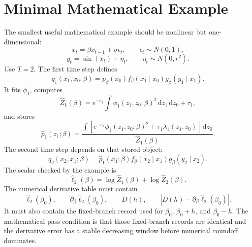 \documentclass[11pt]{article}
\numberwithin{equation}{section}
\newcommand{\dd}{\,\mathrm d}
\newcommand{\widehatell}{\widehat\ell}
\begin{document}
\section{Minimal Mathematical Example}

The smallest useful mathematical example should be nonlinear but one-dimensional:
\begin{equation}
    x_t=\beta x_{t-1}+\sigma\epsilon_t,
    \qquad
    \epsilon_t\sim N(0,1),
    \label{eq:p24-p19-102}
\end{equation}
\begin{equation}
    y_t=\sin(x_t)+\eta_t,
    \qquad
    \eta_t\sim N(0,r^2).
    \label{eq:p24-p19-103}
\end{equation}
Use \(T=2\).  The first time step defines
\begin{equation}
    q_1(x_1,x_0;\beta)
    =
    p_\beta(x_0)
    f_\beta(x_1\mid x_0)
    g_\beta(y_1\mid x_1).
    \label{eq:p24-p19-104}
\end{equation}
It fits \(\phi_1\), computes
\begin{equation}
    \widehat Z_1(\beta)=e^{-c_1}\int \phi_1(z_1,z_0;\beta)^2
    \dd z_1\dd z_0+\tau_1,
    \label{eq:p24-p19-105}
\end{equation}
and stores
\begin{equation}
    \widehat p_1(z_1;\beta)
    =
    \frac{\int
    \left[e^{-c_1}\phi_1(z_1,z_0;\beta)^2+\tau_1\lambda_1(z_1,z_0)\right]
    \dd z_0}
    {\widehat Z_1(\beta)}.
    \label{eq:p24-p19-106}
\end{equation}
The second time step depends on that stored object:
\begin{equation}
    q_2(x_2,x_1;\beta)
    =
    \widehat p_1(x_1;\beta)
    f_\beta(x_2\mid x_1)
    g_\beta(y_2\mid x_2).
    \label{eq:p24-p19-107}
\end{equation}
The scalar checked by the example is
\begin{equation}
    \widehatell_2(\beta)
    =
    \log\widehat Z_1(\beta)
    +
    \log\widehat Z_2(\beta).
    \label{eq:p24-p19-108}
\end{equation}
The numerical derivative table must contain
\begin{equation}
    \widehatell_2(\beta_0),
    \qquad
    \partial_\beta\widehatell_2(\beta_0),
    \qquad
    D(h),
    \qquad
    |D(h)-\partial_\beta\widehatell_2(\beta_0)|.
    \label{eq:p24-p19-109}
\end{equation}
It must also contain the fixed-branch record used for \(\beta_0\),
\(\beta_0+h\), and \(\beta_0-h\).  The mathematical pass condition is that
those fixed-branch records are identical and the derivative error has a stable
decreasing window before numerical roundoff dominates.
\end{document}
